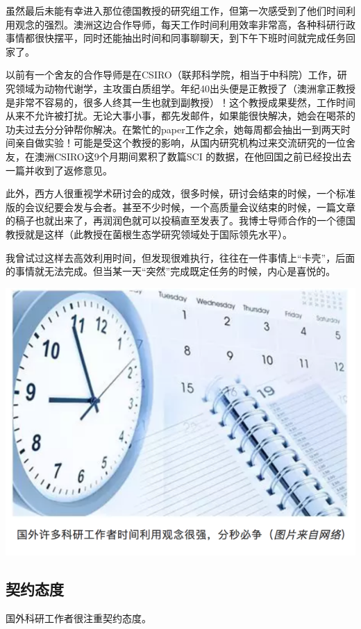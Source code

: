 \documentclass[]{book}
\begin{document}
虽然最后未能有幸进入那位德国教授的研究组工作，但第一次感受到了他们时间利用观念的强烈。澳洲这边合作导师，每天工作时间利用效率非常高，各种科研行政事情都很快摆平，同时还能抽出时间和同事聊聊天，到下午下班时间就完成任务回家了。

以前有一个舍友的合作导师是在CSIRO（联邦科学院，相当于中科院）工作，研究领域为动物代谢学，主攻蛋白质组学。年纪40出头便是正教授了（澳洲拿正教授是非常不容易的，很多人终其一生也就到副教授）！这个教授成果斐然，工作时间从来不允许被打扰。无论大事小事，都先发邮件，如果能很快解决，她会在喝茶的功夫过去分分钟帮你解决。在繁忙的paper工作之余，她每周都会抽出一到两天时间亲自做实验！可能是受这个教授的影响，从国内研究机构过来交流研究的一位舍友，在澳洲CSIRO这9个月期间累积了数篇SCI
的数据，在他回国之前已经投出去一篇并收到了返修意见。

此外，西方人很重视学术研讨会的成效，很多时候，研讨会结束的时候，一个标准版的会议纪要会发与会者。甚至不少时候，一个高质量会议结束的时候，一篇文章的稿子也就出来了，再润润色就可以投稿直至发表了。我博士导师合作的一个德国教授就是这样（此教授在菌根生态学研究领域处于国际领先水平）。

我曾试过这样去高效利用时间，但发现很难执行，往往在一件事情上``卡壳''，后面的事情就无法完成。但当某一天``突然''完成既定任务的时候，内心是喜悦的。

\includegraphics[width=8.33in]{images/osre4}

\subsection{契约态度}

国外科研工作者很注重契约态度。
\end{document}
